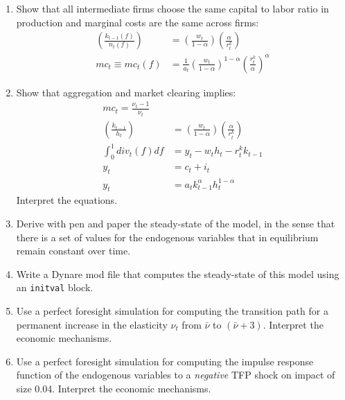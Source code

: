 \documentclass[a4paper]{scrartcl}
\begin{document}
\begin{enumerate}
\item
Show that all intermediate firms choose the same capital to labor ratio in production and marginal costs are the same across firms:
\begin{align}
\left(\frac{k_{t-1}(f)}{n_t(f)}\right) &= \left(\frac{w_t}{1-\alpha}\right) \left(\frac{\alpha}{r^k_t}\right) \label{eq:RBCMonopIrrInv.IntermediateFirms.CapitalLaborRatio}
\\
mc_t \equiv mc_t(f) &= \frac{1}{a_t} {\left(\frac{w_t}{1-\alpha}\right)}^{1-\alpha} {\left(\frac{r^k_t}{\alpha}\right)}^{\alpha} \label{eq:RBCMonopIrrInv.RealMarginalCosts}
\end{align}

\item
Show that aggregation and market clearing implies:
\begin{align}
mc_t = \frac{\nu_t-1}{\nu_t} \label{eq:RBCMonopIrrInv.MarginalCostsAggregated}
\\
\left(\frac{k_{t-1}}{h_t}\right) &= \left(\frac{w_t}{1-\alpha}\right) \left(\frac{\alpha}{r^k_t}\right) \label{eq:RBCMonopIrrInv.IntermediateFirms.CapitalLaborRatioAggregated}
\\
\int_{0}^{1} div_t(f) df &= y_t - w_t h_t - r^k_t k_{t-1}\label{eq:RBCMonopIrrInv.IntermediateFirms.AggregateProfits}
\\
y_t &= c_t + i_t \label{eq:RBCMonopIrrInv.AggregateDemand}
\\
y_t &= a_t k_{t-1}^\alpha h_t^{1-\alpha} \label{eq:RBCMonopIrrInv.AggregateSupply}
\end{align}
Interpret the equations.

\item
Derive with pen and paper the steady-state of the model,
  in the sense that there is a set of values for the endogenous variables that in equilibrium remain constant over time.

\item Write a Dynare mod file that computes the steady-state of this model using an \texttt{initval} block.

\item
Use a perfect foresight simulation for computing the transition path
  for a permanent increase in the elasticity \(\nu_t\) from \(\bar{\nu}\) to \((\bar{\nu}+3)\).
Interpret the economic mechanisms.

\item
Use a perfect foresight simulation for computing the impulse response function of the endogenous variables
  to a \emph{negative} TFP shock on impact of size 0.04.
Interpret the economic mechanisms.

\end{enumerate}
\end{document}
